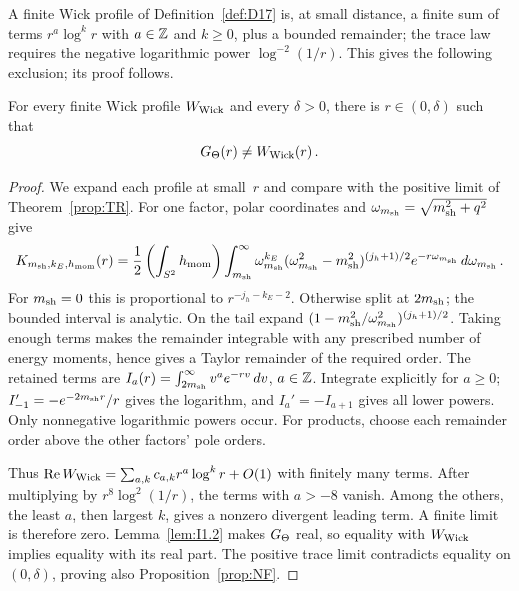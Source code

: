 A finite Wick profile of Definition~\ref{def:D17} is, at small distance, a finite sum of terms $r^a\log^kr$ with $a\in\mathbb{Z}$ and $k\ge0$, plus a bounded remainder; the trace law requires the negative logarithmic power $\log^{-2}(1/r)$. This gives the following exclusion; its proof follows.
\begin{lemma}\label{lem:I2.1}
For every finite Wick profile $W_{\rm Wick}$ and every $\delta>0$, there is $r\in(0,\delta)$ such that
\begin{equation*}
G_{\Theta}(r)\ne W_{\rm Wick}(r)\,.
\end{equation*}
\end{lemma}
\begin{proof}
We expand each profile at small~$r$ and compare with the positive limit of Theorem~\ref{prop:TR}. For one factor, polar coordinates and $\omega_{m_{\rm sh}}=\sqrt{m_{\rm sh}^2+q^2}$ give
\begin{equation*}
K_{m_{\rm sh},k_E,h_{\rm mom}}(r)
=\frac12\left(\int_{S^2}h_{\rm mom}\right)
\int_{m_{\rm sh}}^\infty \omega_{m_{\rm sh}}^{k_E}(\omega_{m_{\rm sh}}^2-m_{\rm sh}^2)^{(j_h+1)/2}e^{-r\omega_{m_{\rm sh}}}\,d\omega_{m_{\rm sh}}\,.
\end{equation*}
For $m_{\rm sh}=0$ this is proportional to $r^{-j_h-k_E-2}$. Otherwise split at $2m_{\rm sh}$; the bounded interval is analytic. On the tail expand $(1-m_{\rm sh}^2/\omega_{m_{\rm sh}}^2)^{(j_h+1)/2}$. Taking enough terms makes the remainder integrable with any prescribed number of energy moments, hence gives a Taylor remainder of the required order. The retained terms are $I_a(r)=\int_{2m_{\rm sh}}^\infty v^ae^{-rv}\,dv$, $a\in\mathbb{Z}$. Integrate explicitly for $a\ge0$; $I_{-1}'=-e^{-2m_{\rm sh}r}/r$ gives the logarithm, and $I_a'=-I_{a+1}$ gives all lower powers. Only nonnegative logarithmic powers occur. For products, choose each remainder order above the other factors' pole orders.

Thus $\operatorname{Re}W_{\rm Wick}=\sum_{a,k}c_{a,k}r^a\log^kr+O(1)$ with finitely many terms. After multiplying by $r^8\log^2(1/r)$, the terms with $a>-8$ vanish. Among the others, the least $a$, then largest $k$, gives a nonzero divergent leading term. A finite limit is therefore zero. Lemma~\ref{lem:I1.2} makes $G_{\Theta}$ real, so equality with $W_{\rm Wick}$ implies equality with its real part. The positive trace limit contradicts equality on $(0,\delta)$, proving also Proposition~\ref{prop:NF}.
\end{proof}

